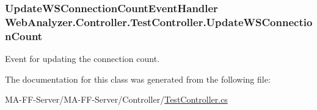 \subsubsection[{Update\+W\+S\+Connection\+Count}]{\setlength{\rightskip}{0pt plus 5cm}Update\+W\+S\+Connection\+Count\+Event\+Handler Web\+Analyzer.\+Controller.\+Test\+Controller.\+Update\+W\+S\+Connection\+Count}\label{class_web_analyzer_1_1_controller_1_1_test_controller_a3b6d28efa43ed99a2bdf0db062ba46e1}


Event for updating the connection count. 



The documentation for this class was generated from the following file\+:\begin{DoxyCompactItemize}
\item 
M\+A-\/\+F\+F-\/\+Server/\+M\+A-\/\+F\+F-\/\+Server/\+Controller/\hyperlink{_test_controller_8cs}{Test\+Controller.\+cs}\end{DoxyCompactItemize}
